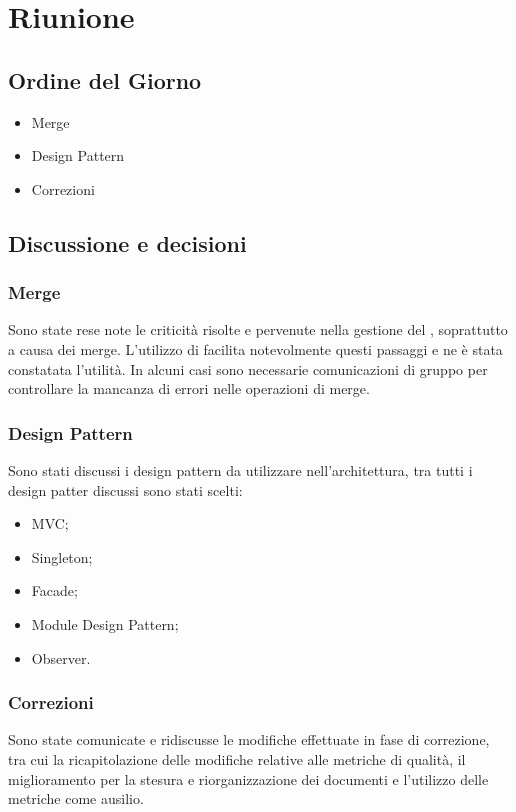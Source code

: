 \section{Riunione}
\subsection{Ordine del Giorno}
\begin{itemize}
	\item Merge
	\item Design Pattern
	\item Correzioni
\end{itemize}

\subsection{Discussione e decisioni}

\subsubsection{Merge}
Sono state rese note le criticità risolte e pervenute nella gestione del , soprattutto a causa dei merge. L'utilizzo di  facilita notevolmente questi passaggi e ne è stata constatata l'utilità. In alcuni casi sono necessarie comunicazioni di gruppo per controllare la mancanza di errori nelle operazioni di merge.

\subsubsection{Design Pattern}
Sono stati discussi i design pattern da utilizzare nell'architettura, tra tutti i design patter discussi sono stati scelti:
\begin{itemize}
	\item MVC;
	\item Singleton;
	\item Facade;
	\item Module Design Pattern;
	\item Observer.
\end{itemize}

\subsubsection{Correzioni}
Sono state comunicate e ridiscusse le modifiche effettuate in fase di correzione, tra cui la ricapitolazione delle modifiche relative alle metriche di qualità, il miglioramento per la stesura e riorganizzazione dei documenti e l'utilizzo delle metriche come ausilio.


\clearpage
